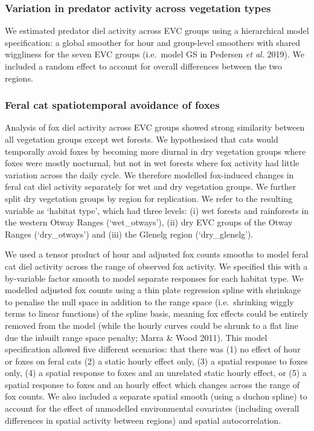 \documentclass[11pt,a4paper,titlepage,twoside,openright]{style/unimelbthesis}
\begin{document}
\begin{mainmatter}
\hypertarget{variation-in-predator-activity-across-vegetation-types}{%
\subsubsection{Variation in predator activity across vegetation types}\label{variation-in-predator-activity-across-vegetation-types}}

We estimated predator diel activity across EVC groups using a hierarchical model specification: a global smoother for hour and group-level smoothers with shared wiggliness for the seven EVC groups (i.e.~model GS in Pedersen \emph{et al.} 2019). We included a random effect to account for overall differences between the two regions.

\hypertarget{feral-cat-spatiotemporal-avoidance-of-foxes}{%
\subsubsection{Feral cat spatiotemporal avoidance of foxes}\label{feral-cat-spatiotemporal-avoidance-of-foxes}}

Analysis of fox diel activity across EVC groups showed strong similarity between all vegetation groups except wet forests. We hypothesised that cats would temporally avoid foxes by becoming more diurnal in dry vegetation groups where foxes were mostly nocturnal, but not in wet forests where fox activity had little variation across the daily cycle. We therefore modelled fox-induced changes in feral cat diel activity separately for wet and dry vegetation groups. We further split dry vegetation groups by region for replication. We refer to the resulting variable as `habitat type', which had three levels: (i) wet forests and rainforests in the western Otway Ranges (`wet\_otways'), (ii) dry EVC groups of the Otway Ranges (`dry\_otways') and (iii) the Glenelg region (`dry\_glenelg').

We used a tensor product of hour and adjusted fox counts smooths to model feral cat diel activity across the range of observed fox activity. We specified this with a by-variable factor smooth to model separate responses for each habitat type. We modelled adjusted fox counts using a thin plate regression spline with shrinkage to penalise the null space in addition to the range space (i.e.~shrinking wiggly terms to linear functions) of the spline basis, meaning fox effects could be entirely removed from the model (while the hourly curves could be shrunk to a flat line due the inbuilt range space penalty; Marra \& Wood 2011). This model specification allowed five different scenarios: that there was (1) no effect of hour or foxes on feral cats (2) a static hourly effect only, (3) a spatial response to foxes only, (4) a spatial response to foxes and an unrelated static hourly effect, or (5) a spatial response to foxes and an hourly effect which changes across the range of fox counts. We also included a separate spatial smooth (using a duchon spline) to account for the effect of unmodelled environmental covariates (including overall differences in spatial activity between regions) and spatial autocorrelation.


\end{mainmatter}
\end{document}
